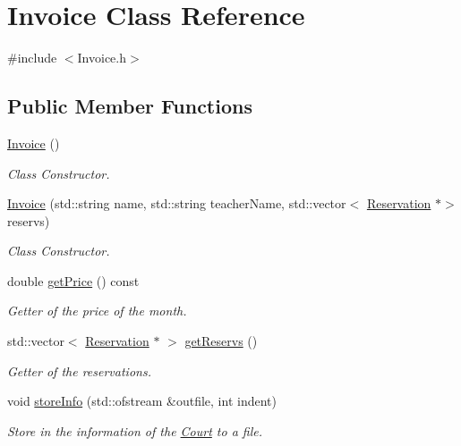 \hypertarget{class_invoice}{}\section{Invoice Class Reference}
\label{class_invoice}


{\ttfamily \#include $<$Invoice.\+h$>$}

\subsection*{Public Member Functions}
\begin{DoxyCompactItemize}
\item 
\mbox{\hyperlink{class_invoice_a25d6ad261479340ac3775e21f03eef90}{Invoice}} ()
\begin{DoxyCompactList}\small\item\em Class Constructor. \end{DoxyCompactList}\item 
\mbox{\hyperlink{class_invoice_a332d51ff2cf16d52178fa61ddc69f017}{Invoice}} (std\+::string name, std\+::string teacher\+Name, std\+::vector$<$ \mbox{\hyperlink{class_reservation}{Reservation}} $\ast$$>$ reservs)
\begin{DoxyCompactList}\small\item\em Class Constructor. \end{DoxyCompactList}\item 
double \mbox{\hyperlink{class_invoice_a049d93832eedd6c40a0b5a686771bdb6}{get\+Price}} () const
\begin{DoxyCompactList}\small\item\em Getter of the price of the month. \end{DoxyCompactList}\item 
std\+::vector$<$ \mbox{\hyperlink{class_reservation}{Reservation}} $\ast$ $>$ \mbox{\hyperlink{class_invoice_a98ede540a39d22c91a3bc6c5b28116fd}{get\+Reservs}} ()
\begin{DoxyCompactList}\small\item\em Getter of the reservations. \end{DoxyCompactList}\item 
void \mbox{\hyperlink{class_invoice_a326f9548d517f1f432939e0c8231a84e}{store\+Info}} (std\+::ofstream \&outfile, int indent)
\begin{DoxyCompactList}\small\item\em Store in the information of the \mbox{\hyperlink{class_court}{Court}} to a file. \end{DoxyCompactList}\item 
$$
\end{DoxyCompactItemize}
